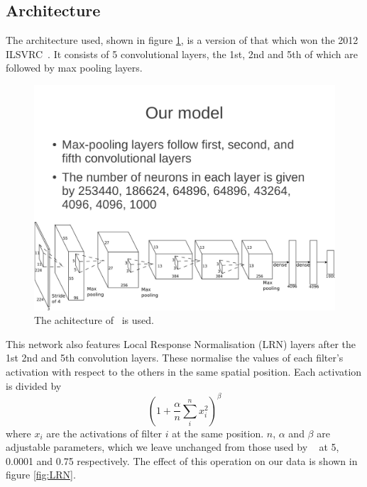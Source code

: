 \documentclass[11pt]{article} %
\begin{document}
\subsection{Architecture}



\label{sec:alexNet}

The architecture used, shown in figure \ref{fig:alexNet}, is a version of that which won the 2012 ILSVRC~\cite{Krizhevsky2012}. It consists of 5 convolutional layers, the 1st, 2nd and 5th of which are followed by max pooling layers. 

\begin{figure}
\centering
\includegraphics*[width=\linewidth,trim={0cm 0cm 0.79cm 12cm},clip]{alexNet} 
\caption{ The achitecture of~\cite{Krizhevsky2012} is used.\label{fig:alexNet}}
\end{figure}



This network also features Local Response Normalisation (LRN) layers after the 1st 2nd and 5th convolution layers. These normalise the values of each filter's activation with respect to the others in the same spatial position. Each activation is divided by
\begin{equation}
(1 + \frac{\alpha}{n} \sum_i^n x_i^2)^\beta
\end{equation}
where $x_i$ are the activations of filter $i$ at the same position. $n$, $\alpha$ and $\beta$ are adjustable parameters, which we leave unchanged from those used by ~\cite{Krizhevsky2012} at 5, 0.0001 and 0.75 respectively. The effect of this operation on our data is shown in figure \ref{fig:LRN}. 
\end{document}
